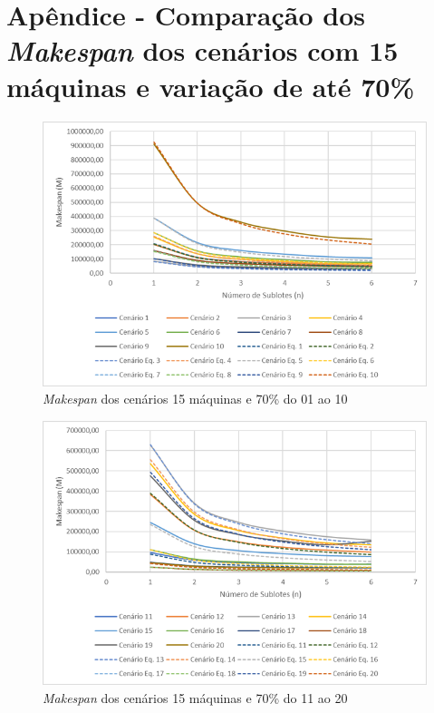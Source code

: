 \newpage
\section{Apêndice - Comparação dos \textit{Makespan} dos cenários com 15 máquinas e variação de até 70\%}\label{app:fig15machine70}

\begin{figure}[H]
    \centering
     \includegraphics[width=13cm]{Apendices/Figuras/15m70_01-10.png}
     \caption{\textit{Makespan} dos cenários 15 máquinas e 70\% do 01 ao 10}
    \label{fig:15m70_01-10}
\end{figure}

\begin{figure}[H]
    \centering
     \includegraphics[width=13cm]{Apendices/Figuras/15m70_11-20.png}
     \caption{\textit{Makespan} dos cenários 15 máquinas e 70\% do 11 ao 20}
    \label{fig:15m70_11-20}
\end{figure}

